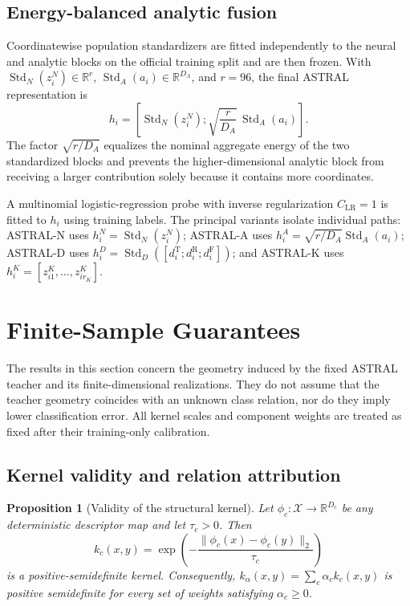 \documentclass[pdflatex,sn-mathphys-num]{sn-jnl}
\newcommand{\1}{\mathbf{1}}
\theoremstyle{plain}
\newtheorem{proposition}{Proposition}
\begin{document}
	\subsection{Energy-balanced analytic fusion}
	
	Coordinatewise population standardizers are fitted independently to
	the neural and analytic blocks on the official training split and are
	then frozen. With $\operatorname{Std}_N(z_i^N)\in\mathbb{R}^{r}$, $\operatorname{Std}_A(a_i)\in\mathbb{R}^{D_A}$, and $r=96$, the final ASTRAL representation is
	\begin{equation}
		h_i
		=
		\left[
		\operatorname{Std}_N(z_i^N);
		\sqrt{\frac{r}{D_A}}\,
		\operatorname{Std}_A(a_i)
		\right].
		\label{eq:fusion}
	\end{equation}
	The factor $\sqrt{r/D_A}$ equalizes the nominal aggregate energy of
	the two standardized blocks and prevents the higher-dimensional
	analytic block from receiving a larger contribution solely because it
	contains more coordinates.
	
	A multinomial logistic-regression probe with inverse regularization $C_{\mathrm{LR}}=1$ is fitted to $h_i$ using training labels. The principal variants isolate individual paths: ASTRAL-N uses $h_i^N=\operatorname{Std}_N(z_i^N)$; ASTRAL-A uses $h_i^A=\sqrt{r/D_A}\operatorname{Std}_A(a_i)$; ASTRAL-D uses $h_i^D=\operatorname{Std}_D([d_i^{\mathrm{T}};d_i^{\mathrm{R}};d_i^{\mathrm{F}}])$; and ASTRAL-K uses $h_i^K=[z^K_{i1},\ldots,z^K_{ir_K}]$.

	\section{Finite-Sample Guarantees}
	
	The results in this section concern the geometry induced by the fixed
	ASTRAL teacher and its finite-dimensional realizations. They do not
	assume that the teacher geometry coincides with an unknown class
	relation, nor do they imply lower classification error. All kernel
	scales and component weights are treated as fixed after their
	training-only calibration.
	
	\subsection{Kernel validity and relation attribution}
	
	\begin{proposition}[Validity of the structural kernel]
		\label{prop:psd}
		Let $\phi_c:\mathcal{X}\rightarrow\mathbb{R}^{D_c}$ be any deterministic descriptor map and let $\tau_c>0$. Then
		\begin{equation}
			k_c(x,y)
			=
			\exp\!\left(
			-\frac{\|\phi_c(x)-\phi_c(y)\|_2}{\tau_c}
			\right)
			\label{eq:component_psd}
		\end{equation}
		is a positive-semidefinite kernel. Consequently, $k_\alpha(x,y)=\sum_c\alpha_ck_c(x,y)$ is positive semidefinite for every set of weights satisfying $\alpha_c\geq0$.
	\end{proposition}
	
\end{document}
